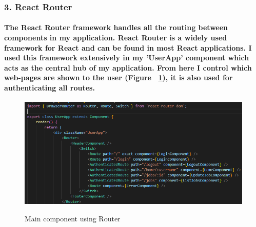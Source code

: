 \subsubsection{3. React Router}
\paragraph{The React Router framework handles all the routing between components in my application. React Router is a widely used framework for React and can be found in most React applications. I used this framework extensively in my 'UserApp' component which acts as the central hub of my application. From here I control which web-pages are shown to the user (Figure ~\ref{router_label}), it is also used for authenticating all routes.}
\begin{figure}[h]
    \centering
    \includegraphics[scale=0.35]{Images/router.png} 
    \label{router_label}
    \caption{Main component using Router}
\end{figure}